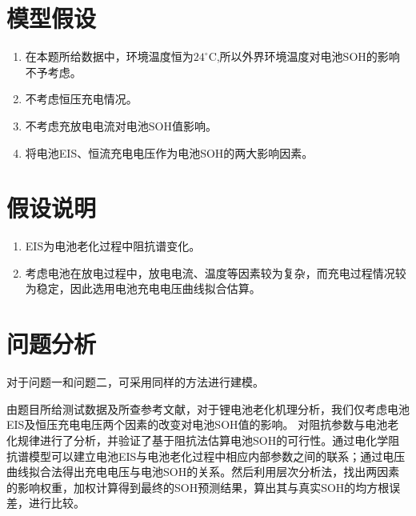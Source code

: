 \documentclass{cumcm}
\begin{document}
\section{模型假设}
\begin{enumerate}
\item 在本题所给数据中，环境温度恒为$24^\circ$C,所以外界环境温度对电池SOH的影响不予考虑。
\item 不考虑恒压充电情况。
\item 不考虑充放电电流对电池SOH值影响。
\item 将电池EIS、恒流充电电压作为电池SOH的两大影响因素。
\end{enumerate}
\section{假设说明}
\begin{enumerate}
\item EIS为电池老化过程中阻抗谱变化。
\item 考虑电池在放电过程中，放电电流、温度等因素较为复杂，而充电过程情况较为稳定，因此选用电池充电电压曲线拟合估算。
\end{enumerate}


\section{问题分析}
对于问题一和问题二，可采用同样的方法进行建模。\par
由题目所给测试数据及所查参考文献，对于锂电池老化机理分析，我们仅考虑电池EIS及恒压充电电压两个因素的改变对电池SOH值的影响。%
对阻抗参数与电池老化规律进行了分析，并验证了基于阻抗法估算电池SOH的可行性。通过电化学阻抗谱模型可以建立电池EIS与电池老化过程中相应内部参数之间的联系；通过电压曲线拟合法得出充电电压与电池SOH的关系。然后利用层次分析法，找出两因素的影响权重，加权计算得到最终的SOH预测结果，算出其与真实SOH的均方根误差，进行比较。
\end{document}
